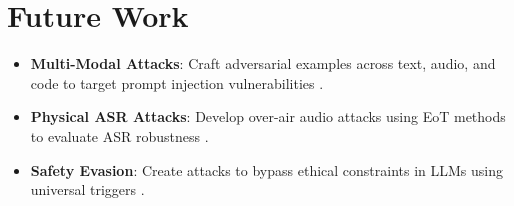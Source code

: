 \documentclass[conference]{IEEEtran}
\begin{document}
\section{Future Work}
\begin{itemize}
\item \textbf{Multi-Modal Attacks}: Craft adversarial examples across text, audio, and code to target prompt injection vulnerabilities \cite{multimodal_attacks}.
\item \textbf{Physical ASR Attacks}: Develop over-air audio attacks using EoT methods to evaluate ASR robustness \cite{eot_methods}.
\item \textbf{Safety Evasion}: Create attacks to bypass ethical constraints in LLMs using universal triggers \cite{safety_alignment_evasion}.
\end{itemize}




\end{document}
